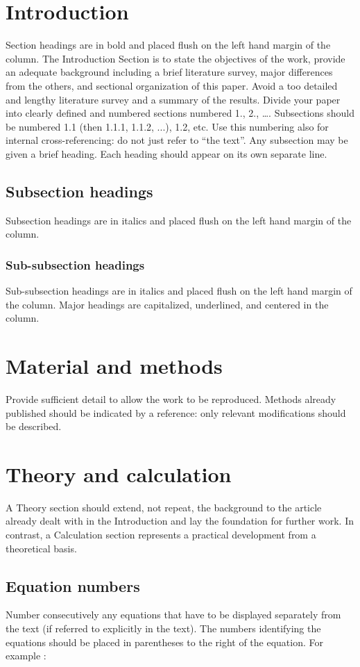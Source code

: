 \documentclass[]{iac}
\begin{document}
\section{Introduction}
Section headings are in bold and placed flush on the left hand margin
of the column.  The Introduction Section is to state the objectives of
the work, provide an adequate background including a brief literature
survey, major differences from the others, and sectional organization
of this paper. Avoid a too detailed and lengthy literature survey and
a summary of the results.  Divide your paper into clearly defined and
numbered sections numbered 1., 2., …. Subsections should be numbered
1.1 (then 1.1.1, 1.1.2, ...), 1.2, etc. Use this numbering also for
internal cross-referencing: do not just refer to “the text”. Any
subsection may be given a brief heading. Each heading should appear on
its own separate line.

\subsection{Subsection headings}
Subsection headings are in italics and placed flush on the left hand
margin of the column.

\subsubsection{Sub-subsection headings}
Sub-subsection headings are in italics and placed flush on the left
hand margin of the column.  Major headings are capitalized,
underlined, and centered in the column.

\section{Material and methods}
Provide sufficient detail to allow the work to be reproduced. Methods
already published should be indicated by a reference: only relevant
modifications should be described.

\section{Theory and calculation}
A Theory section should extend, not repeat, the background to the
article already dealt with in the Introduction and lay the foundation
for further work. In contrast, a Calculation section represents a
practical development from a theoretical basis.

\subsection{Equation numbers}
Number consecutively any equations that have to be displayed
separately from the text (if referred to explicitly in the text). The
numbers identifying the equations should be placed in parentheses to
the right of the equation. For example \cite{newton1934sir}:
\end{document}
